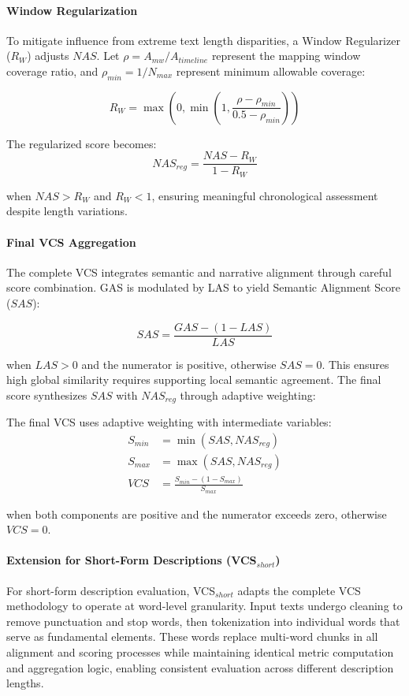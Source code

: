 \documentclass[letterpaper]{article} %
\begin{document}
\paragraph{Window Regularization}
To mitigate influence from extreme text length disparities, a Window Regularizer ($R_W$) adjusts $NAS$. Let $\rho = A_{mw} / A_{timeline}$ represent the mapping window coverage ratio, and $\rho_{min} = 1/N_{max}$ represent minimum allowable coverage:

\begin{equation}
R_W = \max\left(0, \min\left(1, \frac{\rho - \rho_{min}}{0.5 - \rho_{min}}\right)\right)
\end{equation}

The regularized score becomes:
\begin{equation}
NAS_{reg} = \frac{NAS - R_W}{1 - R_W}
\end{equation}

when $NAS > R_W$ and $R_W < 1$, ensuring meaningful chronological assessment despite length variations.

\paragraph{Final VCS Aggregation}
The complete VCS integrates semantic and narrative alignment through careful score combination. GAS is modulated by LAS to yield Semantic Alignment Score ($SAS$):

\begin{equation} \label{eq:sas_revised} 
SAS = \frac{GAS - (1 - LAS)}{LAS}
\end{equation}

when $LAS > 0$ and the numerator is positive, otherwise $SAS = 0$. This ensures high global similarity requires supporting local semantic agreement. The final score synthesizes $SAS$ with $NAS_{reg}$ through adaptive weighting:

The final VCS uses adaptive weighting with intermediate variables:
\begin{align}
S_{min} &= \min(SAS, NAS_{reg}) \label{eq:s_min} \\
S_{max} &= \max(SAS, NAS_{reg}) \label{eq:s_max} \\
VCS &= \frac{S_{min} - (1 - S_{max})}{S_{max}} \label{eq:vcs_final}
\end{align}

when both components are positive and the numerator exceeds zero, otherwise $VCS = 0$.

\paragraph{Extension for Short-Form Descriptions (VCS$_{short}$)}
For short-form description evaluation, VCS$_{short}$ adapts the complete VCS methodology to operate at word-level granularity. Input texts undergo cleaning to remove punctuation and stop words, then tokenization into individual words that serve as fundamental elements. These words replace multi-word chunks in all alignment and scoring processes while maintaining identical metric computation and aggregation logic, enabling consistent evaluation across different description lengths.
\end{document}
